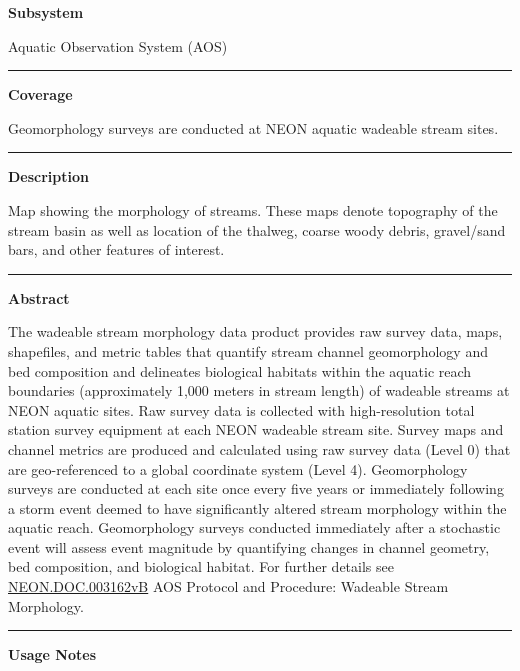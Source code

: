 \documentclass[]{article}
\begin{document}
\textbf{Subsystem}

Aquatic Observation System (AOS)

\begin{center}\rule{0.5\linewidth}{\linethickness}\end{center}

\textbf{Coverage}

Geomorphology surveys are conducted at NEON aquatic wadeable stream
sites.

\begin{center}\rule{0.5\linewidth}{\linethickness}\end{center}

\textbf{Description}

Map showing the morphology of streams. These maps denote topography of
the stream basin as well as location of the thalweg, coarse woody
debris, gravel/sand bars, and other features of interest.

\begin{center}\rule{0.5\linewidth}{\linethickness}\end{center}

\textbf{Abstract}

The wadeable stream morphology data product provides raw survey data,
maps, shapefiles, and metric tables that quantify stream channel
geomorphology and bed composition and delineates biological habitats
within the aquatic reach boundaries (approximately 1,000 meters in
stream length) of wadeable streams at NEON aquatic sites. Raw survey
data is collected with high-resolution total station survey equipment at
each NEON wadeable stream site. Survey maps and channel metrics are
produced and calculated using raw survey data (Level 0) that are
geo-referenced to a global coordinate system (Level 4). Geomorphology
surveys are conducted at each site once every five years or immediately
following a storm event deemed to have significantly altered stream
morphology within the aquatic reach. Geomorphology surveys conducted
immediately after a stochastic event will assess event magnitude by
quantifying changes in channel geometry, bed composition, and biological
habitat. For further details see
\href{http://data.neonscience.org/api/v0/documents/NEON.DOC.003162vB}{NEON.DOC.003162vB}
AOS Protocol and Procedure: Wadeable Stream Morphology.

\begin{center}\rule{0.5\linewidth}{\linethickness}\end{center}

\textbf{Usage Notes}
\end{document}
